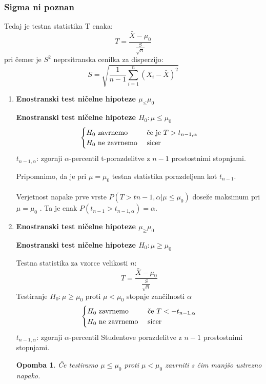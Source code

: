 \documentclass[11pt]{article}
\newtheorem{Opomba}[Izrek]{{\sc Opomba}}
\begin{document}
	\subsubsection{Sigma ni poznan}
	Tedaj je testna statistika T enaka:
	$$T = \frac{\bar{X} - \mu_0}{\frac{S}{\sqrt{n}}}$$
	pri čemer je $S^2$ neprsitranska cenilka za disperzijo:
	$$S = \sqrt{\frac{1}{n-1}\sum_{i = 1}^{n}(X_i - \bar{X})^2}$$
	\begin{enumerate}
		\item
		 \textbf{Enostranski test ničelne hipoteze $\mu_ \le \mu_0$}
		 \begin{framed}
		 	\textbf{Enostranski test ničelne hipoteze $H_0: \mu\le \mu_0$}
		 	\[
		 	\begin{cases}
		 	H_0 \textnormal{ zavrnemo } & \textnormal{če je } T > t_{n-1,\alpha}\\
		 	H_0 \textnormal{ ne zavrnemo } & \textnormal{sicer} 
		 	\end{cases}
		 	\]
		 	$t_{n-1,\alpha}$: zgornji $\alpha$-percentil t-porazdelitve z $n-1$ prostostnimi stopnjami.
		 \end{framed}
	 Pripomnimo, da je pri $\mu = \mu_0$ testna statistika porazdeljena kot $t_{n-1}$.
	 \\
	 \\
	 Verjetnost napake prve vrste $P(T> t{n-1,\alpha} | \mu \le \mu_0)$ doseže maksimum pri $\mu = \mu_0$ . Ta je enak $P(t_{n-1} > t_{n-1,\alpha}) = \alpha$.
	 \item
	 	\textbf{Enostranski test ničelne hipoteze $\mu_ \ge \mu_0$}
	 \begin{framed}
	 	\begin{center}
	 		\textbf{Enostranski test ničelne hipoteze $H_0: \mu \ge \mu_0$}
	 	\end{center}
	 	Testna statistika za vzorce velikosti $n$:
	 	$$T = \frac{\bar{X} - \mu_0}{\frac{S}{\sqrt{n}}}$$
	 	Testiranje $H_0: \mu \ge \mu_0$ proti $\mu < \mu_0$ stopnje zančilnosti $\alpha$
	 	\[
	 	\begin{cases}
	 	H_0 \textnormal{ zavrnemo } & \textnormal{če } T < -t_{n-1,\alpha}\\
	 	H_0 \textnormal{ ne zavrnemo } & \textnormal{sicer}
	 	\end{cases}
	 	\]
	 	$t_{n-1,\alpha}$: zgornji $\alpha$-percentil Studentove porazdelitve z $n-1$ prostostnimi stopnjami.
	 \end{framed}
 \begin{Opomba}
 	Če testiramo $\mu \le \mu_0$ proti $\mu <\mu_0$ zavrniti s čim manjšo ustrezno napako.

\end{Opomba}
\end{enumerate}
\end{document}
